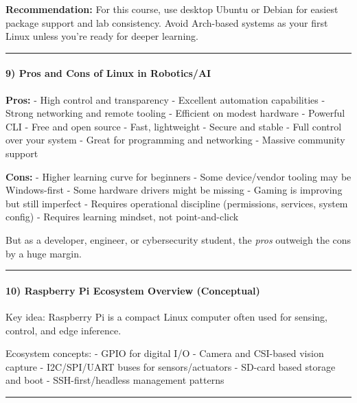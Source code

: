 \documentclass[
  english,
  paper=a4,
  oneside  ,captions=tableheading
]{scrartcl}
\renewenvironment{quote}{\begin{customblockquote}\list{}{\rightmargin=0em\leftmargin=0em}%
\item\relax\color{blockquote-text}\ignorespaces}{\unskip\unskip\endlist\end{customblockquote}}
\begin{document}
\begin{quote}
\textbf{Recommendation:} For this course, use desktop Ubuntu or Debian
for easiest package support and lab consistency. Avoid Arch-based
systems as your first Linux unless you're ready for deeper learning.
\end{quote}

\begin{center}\rule{0.5\linewidth}{0.5pt}\end{center}

\paragraph{9) Pros and Cons of Linux in
Robotics/AI}\label{pros-and-cons-of-linux-in-roboticsai}

\textbf{Pros:} - High control and transparency - Excellent automation
capabilities - Strong networking and remote tooling - Efficient on
modest hardware - Powerful CLI - Free and open source - Fast,
lightweight - Secure and stable - Full control over your system - Great
for programming and networking - Massive community support

\textbf{Cons:} - Higher learning curve for beginners - Some
device/vendor tooling may be Windows-first - Some hardware drivers might
be missing - Gaming is improving but still imperfect - Requires
operational discipline (permissions, services, system config) - Requires
learning mindset, not point-and-click

But as a developer, engineer, or cybersecurity student, the \emph{pros}
outweigh the cons by a huge margin.

\begin{center}\rule{0.5\linewidth}{0.5pt}\end{center}

\paragraph{10) Raspberry Pi Ecosystem Overview
(Conceptual)}\label{raspberry-pi-ecosystem-overview-conceptual}

Key idea: Raspberry Pi is a compact Linux computer often used for
sensing, control, and edge inference.

Ecosystem concepts: - GPIO for digital I/O - Camera and CSI-based vision
capture - I2C/SPI/UART buses for sensors/actuators - SD-card based
storage and boot - SSH-first/headless management patterns

\begin{center}\rule{0.5\linewidth}{0.5pt}\end{center}
\end{document}
